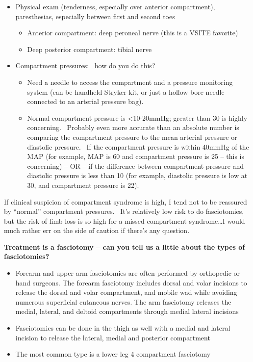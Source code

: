 \documentclass[
]{book}
\begin{document}
\begin{itemize}
\item
  Physical exam (tenderness, especially over anterior compartment),
  paresthesias, especially between first and second toes

  \begin{itemize}
  \item
    Anterior compartment: deep peroneal nerve (this is a VSITE
    favorite)
  \item
    Deep posterior compartment: tibial nerve\citep{velmahos2002}
  \end{itemize}
\item
  Compartment pressures:~ how do you do this?

  \begin{itemize}
  \item
    Need a needle to access the compartment and a pressure
    monitoring system (can be handheld Stryker kit, or just a hollow
    bore needle connected to an arterial pressure bag).
  \item
    Normal compartment pressure is \textless10-20mmHg; greater than 30 is
    highly concerning.~ Probably even more accurate than an absolute
    number is comparing the compartment pressure to the mean
    arterial pressure or diastolic pressure.~ If the compartment
    pressure is within 40mmHg of the MAP (for example, MAP is 60 and
    compartment pressure is 25 -- this is concerning) -- OR -- if
    the difference between compartment pressure and diastolic
    pressure is less than 10 (for example, diastolic pressure is low
    at 30, and compartment pressure is 22).
  \end{itemize}
\end{itemize}

If clinical suspicion of compartment syndrome is high, I tend not to be
reassured by ``normal'' compartment pressures.~ It's relatively low risk
to do fasciotomies, but the risk of limb loss is so high for a missed
compartment syndrome\ldots I would much rather err on the side of caution if
there's any question.

\textbf{Treatment is a fasciotomy -- can you tell us a little about the types
of fasciotomies?}

\begin{itemize}
\item
  Forearm and upper arm fasciotomies are often performed by orthopedic
  or hand surgeons. The forearm fasciotomy includes dorsal and volar
  incisions to release the dorsal and volar compartment, and mobile
  wad while avoiding numerous superficial cutaneous nerves. The arm
  fasciotomy releases the medial, lateral, and deltoid compartments
  through medial lateral incisions~
\item
  Fasciotomies can be done in the thigh as well with a medial and
  lateral incision to release the lateral, medial and posterior
  compartment
\item
  The most common type is a lower leg 4 compartment fasciotomy~
\end{itemize}
\end{document}
